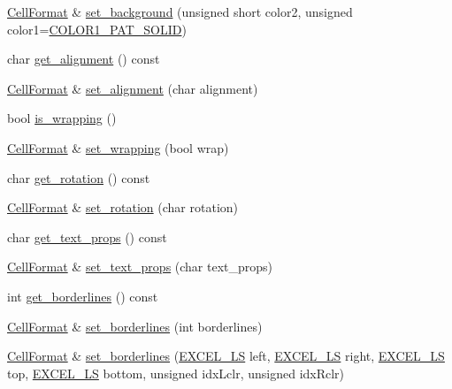 \begin{DoxyCompactItemize}
\item 
\hyperlink{struct_excel_format_1_1_cell_format}{Cell\+Format} \& \hyperlink{struct_excel_format_1_1_cell_format_ac77a06cfd205a5ffd2ef5634fda143fc}{set\+\_\+background} (unsigned short color2, unsigned color1=\hyperlink{namespace_excel_format_ac32635705247b08ca94547c6d08b9f2fa10706675844e1f7f20012859838a1409}{C\+O\+L\+O\+R1\+\_\+\+P\+A\+T\+\_\+\+S\+O\+L\+I\+D})
\item 
char \hyperlink{struct_excel_format_1_1_cell_format_ad7f9a98c1f288ec442caf1964a78394b}{get\+\_\+alignment} () const 
\item 
\hyperlink{struct_excel_format_1_1_cell_format}{Cell\+Format} \& \hyperlink{struct_excel_format_1_1_cell_format_a4de90d5c3b6093581df4e93253f7e7fd}{set\+\_\+alignment} (char alignment)
\item 
bool \hyperlink{struct_excel_format_1_1_cell_format_ae982edb095d1a18b2c415a444ac64ec4}{is\+\_\+wrapping} ()
\item 
\hyperlink{struct_excel_format_1_1_cell_format}{Cell\+Format} \& \hyperlink{struct_excel_format_1_1_cell_format_a63101baf36c420d84d0637b4c1892e3b}{set\+\_\+wrapping} (bool wrap)
\item 
char \hyperlink{struct_excel_format_1_1_cell_format_a77cf40136e6c4b952a2a8fa6cd3e896d}{get\+\_\+rotation} () const 
\item 
\hyperlink{struct_excel_format_1_1_cell_format}{Cell\+Format} \& \hyperlink{struct_excel_format_1_1_cell_format_a092034fdd56421959ff1f5b62f48def7}{set\+\_\+rotation} (char rotation)
\item 
char \hyperlink{struct_excel_format_1_1_cell_format_a9205093a5e79bf88c12e44f5a29ce834}{get\+\_\+text\+\_\+props} () const 
\item 
\hyperlink{struct_excel_format_1_1_cell_format}{Cell\+Format} \& \hyperlink{struct_excel_format_1_1_cell_format_a10bec37cc0c639ba5101788e6e395d82}{set\+\_\+text\+\_\+props} (char text\+\_\+props)
\item 
int \hyperlink{struct_excel_format_1_1_cell_format_ad9ee83cc3d243323f5032638c63bdb3d}{get\+\_\+borderlines} () const 
\item 
\hyperlink{struct_excel_format_1_1_cell_format}{Cell\+Format} \& \hyperlink{struct_excel_format_1_1_cell_format_a9ae656edccfa8869fdf27f3ea87b212a}{set\+\_\+borderlines} (int borderlines)
\item 
\hyperlink{struct_excel_format_1_1_cell_format}{Cell\+Format} \& \hyperlink{struct_excel_format_1_1_cell_format_a3f1e70708c0836e8ab66df96b4fe58f3}{set\+\_\+borderlines} (\hyperlink{namespace_excel_format_af723db0cf2ef2243e273dcf782c51355}{E\+X\+C\+E\+L\+\_\+\+L\+S} left, \hyperlink{namespace_excel_format_af723db0cf2ef2243e273dcf782c51355}{E\+X\+C\+E\+L\+\_\+\+L\+S} right, \hyperlink{namespace_excel_format_af723db0cf2ef2243e273dcf782c51355}{E\+X\+C\+E\+L\+\_\+\+L\+S} top, \hyperlink{namespace_excel_format_af723db0cf2ef2243e273dcf782c51355}{E\+X\+C\+E\+L\+\_\+\+L\+S} bottom, unsigned idx\+Lclr, unsigned idx\+Rclr)

\end{DoxyCompactItemize}

